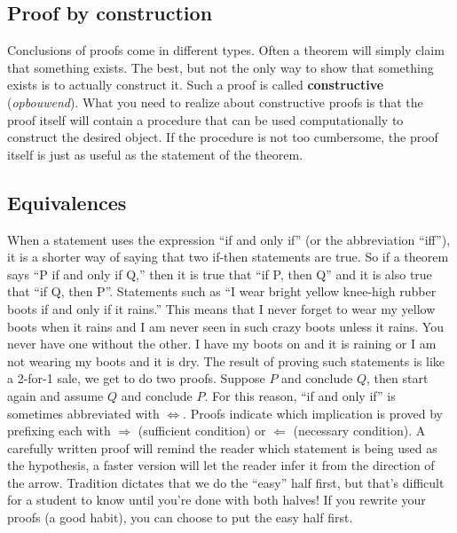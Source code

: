 \subsection{Proof by construction}
Conclusions of proofs come in different types. Often a theorem will simply claim that something exists. The best, but not the only way to show that something exists is to actually construct it. Such a proof is called \textbf{constructive}  (\textit{opbouwend}). What you need to realize about constructive proofs is that the proof itself will contain a procedure that can be used computationally to construct the desired object. If the procedure is not too cumbersome, the proof itself is just as useful as the statement of the theorem.

\subsection{Equivalences}
When a statement uses the expression ``if and only if'' (or the abbreviation ``iff''), it is a shorter way of saying that two if-then statements are true. So if a theorem says ``P if and only if Q,'' then it is true that ``if P, then Q'' and it is also true that ``if Q, then P''. Statements such as ``I wear bright yellow knee-high rubber boots if and only if it rains.'' This means that I never forget to wear my yellow boots when it rains and I am never seen in such crazy boots unless it rains. You never have one without the other. I have my boots on and it is raining or I am not wearing my boots and it is dry.
%
The result of proving such statements is like a 2-for-1 sale, we get to do two proofs. Suppose $P$ and conclude $Q$, then start again and assume $Q$ and conclude $P$. For this reason, ``if and only if'' is sometimes abbreviated with $\iff$. Proofs indicate which implication is proved by prefixing each with $\Rightarrow$ (sufficient condition) or $\Leftarrow$ (necessary condition). A carefully written proof will remind the reader which statement is being used as the hypothesis, a faster version will let the reader infer it from the direction of the arrow. Tradition dictates that we do the ``easy'' half first, but that's difficult for a student to know until you're done with both halves! If you rewrite your proofs (a good habit), you can choose to put the easy half first.
%
